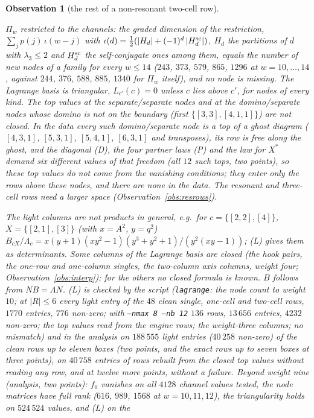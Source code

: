 \documentclass[11pt]{article}
\newtheorem{observation}{Observation}
\newcommand{\Lam}{\Lambda}
\newcommand{\LMPH}[1]{\texttt{#1}}
\begin{document}
\begin{observation}[the rest of a non-resonant two-cell row]
\begin{itemize}
$\Pi_w$ restricted to the channels: the graded dimension of the restriction, $\sum_jp(j)\,\iota(w-j)$ with
$\iota(d)=\frac12(|H_d|+(-1)^d\,|H_d^{\rm sc}|)$, $H_d$ the partitions of $d$ with $\lambda_3\le2$ and $H_d^{\rm sc}$ the
self-conjugate ones among them, equals the number of new nodes of a family for every $w\le14$ ($243$, $373$, $579$,
$865$, $1296$ at $w=10,\dots,14$, against $244$, $376$, $588$, $885$, $1340$ for $\Pi_w$ itself), and no node is
missing.  The Lagrange basis is
triangular, $L_{c'}(c)=0$ unless $c$ lies above $c'$, for nodes of every kind.  The top values at the separate/separate
nodes and at the domino/separate nodes whose domino is not on the boundary (first $\{[3,3],[4,1,1]\}$) are not closed.
In the data every such domino/separate node is a top of a ghost diagram ($[4,3,1]$, $[5,3,1]$, $[5,4,1]$, $[6,3,1]$ and
transposes), its row is free along the ghost, and the diagonal (D), the four partner laws (P) and the law for $X^*$ demand
six different values of that freedom (all $12$ such tops, two points), so these top values do not come from the
vanishing conditions; they enter only the rows above these nodes, and there are none in the data.  The resonant and
three-cell rows need a larger space (Observation~\ref{obs:resrows}).
\end{itemize}
The light columns are not products in general, e.g.\ for $c=\{[2,2],[4]\}$, $X=\{[2,1],[3]\}$ (with $x=A^2$, $y=q^2$)
$B_{cX}/\Lam_c=x(y+1)(xy^2-1)(y^3+y^2+1)/(y^2(xy-1))$; (L) gives them as determinants.  Some columns of the Lagrange
basis are closed (the hook pairs, the one-row and one-column singles, the two-column axis columns, weight four;
Observation~\ref{obs:interp}); for the others no closed formula is known.  $B$ follows from $NB=\Lam N$.  (L) is checked by the script (\LMPH{lagrange}: the node
count to weight $10$; at $|R|\le6$ every light entry of the $48$ clean single, one-cell and two-cell rows, $1770$ entries,
$776$ non-zero; with \LMPH{--nmax 8 --nb 12} $136$ rows, $13\,656$ entries, $4232$ non-zero; the top values read from the
engine rows; the weight-three columns; no mismatch) and in the analysis on $188\,555$ light entries ($40\,258$ non-zero)
of the clean rows up to eleven boxes (two points, and the exact rows up to seven boxes at three points), on $40\,758$
entries of rows rebuilt from the closed top values without reading any row, and at twelve more points, without a
failure.  Beyond weight nine (analysis, two points): $f_0$ vanishes on all $4128$ channel values tested, the node matrices
have full rank ($616$, $989$, $1568$ at $w=10,11,12$), the triangularity holds on $524\,524$ values, and (L) on the

\end{observation}
\end{document}

